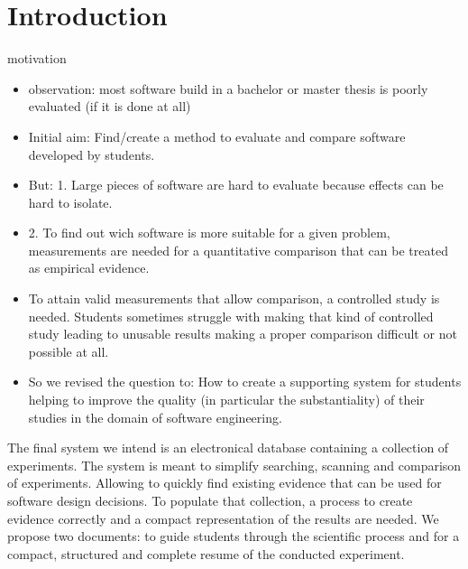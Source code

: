 

\section{Introduction}

motivation

\begin{itemize}
\item observation: most software build in a bachelor or master thesis is poorly evaluated (if it is done at all)
\item Initial aim: Find/create a method to evaluate and compare software developed by students.
\item But: 1. Large pieces of software are hard to evaluate because effects can be hard to isolate.
\item 2.  To find out wich software is more suitable for a given problem, measurements are needed for a quantitative comparison that can be treated as empirical evidence.
\item To attain valid measurements that allow comparison, a controlled study is needed.
Students sometimes struggle with making that kind of controlled study  leading to unusable results making a proper comparison difficult or not possible at all.
\item So we revised the question to:
How to create a supporting system for students helping to improve the quality (in particular the substantiality) of their studies in the domain of software engineering.

\end{itemize}

The final system we intend is an electronical database containing a collection of experiments. The system is meant to simplify searching, scanning and comparison of experiments. Allowing to quickly find existing evidence that can be used for software design decisions. To populate that collection, a process to create evidence correctly and a compact representation of the results are needed. We propose two documents: \emph{\checklist} to guide students through the scientific process and \emph{\briefingform} for a compact, structured and complete resume of the conducted experiment. 




